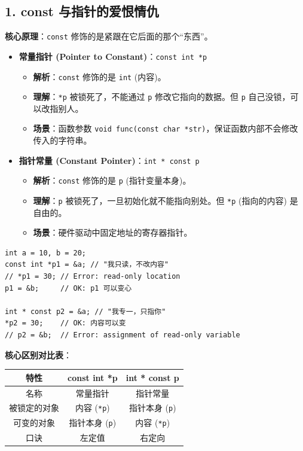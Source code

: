 \documentclass[a4paper,12pt]{article}
\begin{document}
\subsection{1. const 与指针的爱恨情仇}
\textbf{核心原理}：\texttt{const} 修饰的是紧跟在它后面的那个“东西”。
\begin{itemize}
    \item \textbf{常量指针 (Pointer to Constant)}：\texttt{const int *p}
    \begin{itemize}
        \item \textbf{解析}：\texttt{const} 修饰的是 \texttt{int} (内容)。
        \item \textbf{理解}：\texttt{*p} 被锁死了，不能通过 \texttt{p} 修改它指向的数据。但 \texttt{p} 自己没锁，可以改指别人。
        \item \textbf{场景}：函数参数 \texttt{void func(const char *str)}，保证函数内部不会修改传入的字符串。
    \end{itemize}
    \item \textbf{指针常量 (Constant Pointer)}：\texttt{int * const p}
    \begin{itemize}
        \item \textbf{解析}：\texttt{const} 修饰的是 \texttt{p} (指针变量本身)。
        \item \textbf{理解}：\texttt{p} 被锁死了，一旦初始化就不能指向别处。但 \texttt{*p} (指向的内容) 是自由的。
        \item \textbf{场景}：硬件驱动中固定地址的寄存器指针。
    \end{itemize}
\end{itemize}
\begin{lstlisting}
int a = 10, b = 20;
const int *p1 = &a; // "我只读，不改内容"
// *p1 = 30; // Error: read-only location
p1 = &b;     // OK: p1 可以变心

int * const p2 = &a; // "我专一，只指你"
*p2 = 30;    // OK: 内容可以变
// p2 = &b;  // Error: assignment of read-only variable
\end{lstlisting}

\textbf{核心区别对比表}：
\begin{center}
\begin{tabular}{|c|c|c|}
\hline
\textbf{特性} & \textbf{const int *p} & \textbf{int * const p} \\
\hline
名称 & 常量指针 & 指针常量 \\
\hline
被锁定的对象 & 内容 (\texttt{*p}) & 指针本身 (\texttt{p}) \\
\hline
可变的对象 & 指针本身 (\texttt{p}) & 内容 (\texttt{*p}) \\
\hline
口诀 & 左定值 & 右定向 \\
\hline
\end{tabular}
\end{center}
\end{document}
